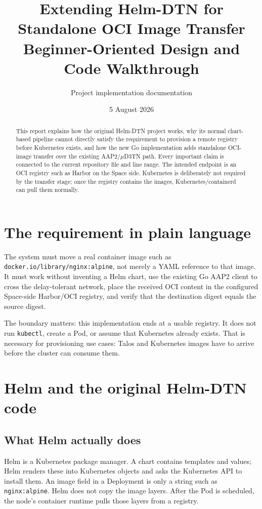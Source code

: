 \documentclass[11pt,a4paper]{article}
\title{Extending Helm-DTN for Standalone OCI Image Transfer\\
\large Beginner-Oriented Design and Code Walkthrough}
\author{Project implementation documentation}
\date{5 August 2026}
\newcommand{\file}[1]{\texttt{#1}}
\begin{document}
\maketitle
\begin{abstract}
This report explains how the original Helm-DTN project works, why its normal
chart-based pipeline cannot directly satisfy the requirement to provision a
remote registry before Kubernetes exists, and how the new Go implementation
adds standalone OCI-image transfer over the existing AAP2/\(\mu\)D3TN path.
Every important claim is connected to the current repository file and line
range. The intended endpoint is an OCI registry such as Harbor on the Space
side. Kubernetes is deliberately not required by the transfer stage; once the
registry contains the images, Kubernetes/containerd can pull them normally.
\end{abstract}

\tableofcontents
\newpage

\section{The requirement in plain language}
The system must move a real container image such as
\file{docker.io/library/nginx:alpine}, not merely a YAML reference to that
image. It must work without inventing a Helm chart, use the existing Go AAP2
client to cross the delay-tolerant network, place the received OCI content in
the configured Space-side Harbor/OCI registry, and verify that the destination
digest equals the source digest.

The boundary matters: this implementation ends at a usable registry. It does
not run \file{kubectl}, create a Pod, or assume that Kubernetes already exists.
That is necessary for provisioning use cases: Talos and Kubernetes images have
to arrive before the cluster can consume them.

\section{Helm and the original Helm-DTN code}
\subsection{What Helm actually does}
Helm is a Kubernetes package manager. A chart contains templates and values;
Helm renders these into Kubernetes objects and asks the Kubernetes API to
install them. An image field in a Deployment is only a string such as
\file{nginx:alpine}. Helm does not copy the image layers. After the Pod is
scheduled, the node's container runtime pulls those layers from a registry.
\end{document}
